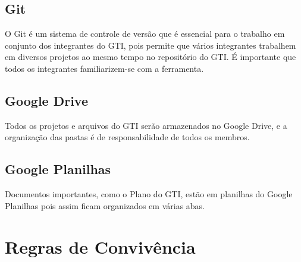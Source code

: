 \documentclass{article}
\begin{document}
\subsection{Git}
O Git é um sistema de controle de versão que é essencial para o trabalho em conjunto dos integrantes do GTI, pois permite que vários integrantes trabalhem em diversos projetos ao mesmo tempo no repositório do GTI. É importante que todos os integrantes familiarizem-se com a ferramenta.

\subsection{Google Drive}
Todos os projetos e arquivos do GTI serão armazenados no Google Drive, e a organização das pastas é de responsabilidade de todos os membros.

\subsection{Google Planilhas}
Documentos importantes, como o Plano do GTI, estão em planilhas do Google Planilhas pois assim ficam organizados em várias abas.

\section{Regras de Convivência}
\end{document}
